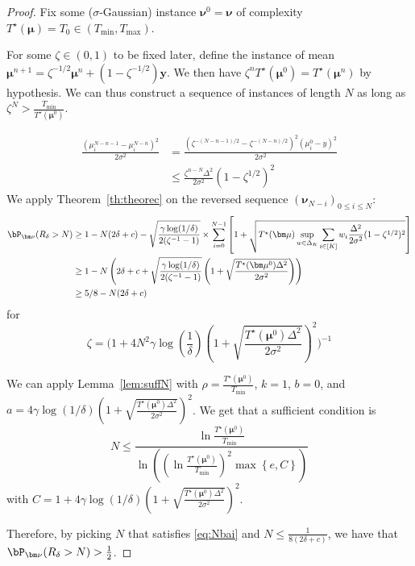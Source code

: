 \begin{proof}
	Fix some ($\sigma$-Gaussian) instance $\bm\nu^0=\bm\nu$ of complexity $T^\star(\bm\mu)=T_0\in(T_{\min},T_{\max})$. 
	
	For some $\zeta\in (0,1)$ to be fixed later, define the instance of mean $\bm\mu^{n+1}=\zeta^{-1/2}\bm\mu^n+(1-\zeta^{-1/2})\bm y$. We then have $\zeta^nT^\star(\bm\mu^0)= T^\star(\bm\mu^{n})$ by hypothesis. We can thus construct a sequence of instances of length $N$ as long as $\zeta^{N} > \frac{T_{\min}}{T^\star(\bm\mu^0)}$.
	
	\begin{align*} \frac{(\mu_i^{N-n-1}-\mu_i^{N-n})^2}{2\sigma^2} &= \frac{(\zeta^{-(N-n-1)/2}-\zeta^{-(N-n)/2})^2(\mu_i^0-y)^2}{2\sigma^2}\\ &\leq \frac{\zeta^{n-N}\Delta^2}{2\sigma^2} (1-\zeta^{1/2})^2\end{align*}
	We apply Theorem~\ref{th:theorec} on the reversed sequence $\left( \bm\nu_{N-i}\right)_{0\leq i\leq N}$:
	\begin{align*}\bP_{{\bm\nu}}(R_\delta>N) &\geq 1-N(2\delta+c)-\sqrt{\frac{\gamma\log(1/\delta)}{2(\zeta^{-1}-1)}}\times \sum_{i=0}^{N-1} \left[ 1 +\sqrt{T^\star(\bm\mu)\sup_{w\in \Delta_K}\sum_{i\in[K]}w_i \frac{\Delta^2}{2\sigma^2} (1-\zeta^{1/2})^2}\right]\\
		&\geq 1-N\left(2\delta+c+\sqrt{\frac{\gamma\log(1/\delta)}{2(\zeta^{-1}-1)}} \left(1+\sqrt{\frac{T^\star(\bm\mu^0)\Delta^2}{2\sigma^2}}\right)\right)\\
		&\geq 5/8-N(2\delta+c)\end{align*} for \[\zeta =\Bigg( 1+4N^2\gamma\log\left(\frac{1}{\delta}\right)\left(1+\sqrt{\frac{T^\star(\bm\mu^0)\Delta^2}{2\sigma^2}}\right)^2\Bigg)^{-1}\]
	
	
	We can apply Lemma~\ref{lem:suffN} with $\rho = \frac{T^\star(\bm\mu^0)}{T_{\min}}$, $k=1$, $b=0$, and $a=4\gamma\log(1/\delta)\left(1+\sqrt{\frac{T^\star(\bm\mu^0)\Delta^2}{2\sigma^2}}\right)^2$. We get that a sufficient condition is \begin{equation} \label{eq:Nbai} N\leq \frac{\ln \frac{T^\star(\bm\mu^0)}{T_{\min}}}{\ln\left( \left(\ln \frac{T^\star(\bm\mu^0)}{T_{\min}}\right)^2 \max\left\{e,C\right\} \right)}\end{equation} with $C=1+4\gamma\log(1/\delta)\left(1+\sqrt{\frac{T^\star(\bm\mu^0)\Delta^2}{2\sigma^2}}\right)^2$.
	
	Therefore, by picking $N$ that satisfies \eqref{eq:Nbai} and $N\leq \frac{1}{8(2\delta+c)}$, we have that $\bP_{\bm\nu}(R_\delta > N)>\frac{1}{2}$.
\end{proof}




